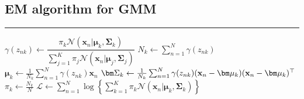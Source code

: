 \documentclass{article}
\begin{document}
    \subsection{EM algorithm for GMM}
        \begin{algorithm}[H]
            \DontPrintSemicolon

            \caption{EM algorithm for a Gaussian mixture model}


            \BlankLine
            \hrule

            {
                {
                    {
                        $\gamma(z_{nk}) \leftarrow \dfrac{\pi_k\mathcal{N}(\textbf{x}_n|\bm\mu_k,\bm\Sigma_k)}{\sum_{j=1}^{K}\pi_j\mathcal{N}(\textbf{x}_n|\bm\mu_j,\bm\Sigma_j)}$\;
                    }
                }
                {
                    $N_k \leftarrow \sum_{n=1}^{N}\gamma(z_{nk})$\;
                    $\bm\mu_k \leftarrow \frac{1}{N_k}\sum_{n=1}^{N}\gamma(z_{nk})\textbf{x}_n$\;
                    $\bm\Sigma_k \leftarrow \frac{1}{N_k}\sum_{n=1}^{N}\gamma(z_{nk})(\textbf{x}_n-\bm\mu_k)(\textbf x_n-\bm\mu_k)^{\top}$\;
                    $\pi_k \leftarrow \frac{N_k}{N}$\;
                }
                $\mathcal{L} \leftarrow \sum_{n=1}^{N}\log{\left\{ \sum_{k=1}^{K}\pi_k\mathcal{N}(\textbf{x}_n|\bm\mu_k,\bm\Sigma_k) \right\}}$\;
            }

        \end{algorithm}
\end{document}
